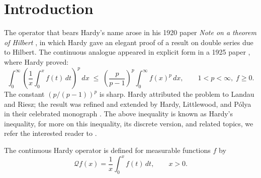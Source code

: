 \documentclass[12pt,a4paper]{amsart}
\theoremstyle{definition}
\newcommand{\dt}{\,dt}
\newcommand{\dx}{\,dx}
\begin{document}
\section{Introduction}
The operator that bears Hardy's name arose in his 1920 paper
\emph{Note on a theorem of Hilbert} \cite{Hardy1920}, in which Hardy
gave an elegant proof of a result on double series due to Hilbert.
The continuous analogue appeared in explicit form in a 1925 paper
\cite{Hardy1925}, where Hardy proved:
\[
  \int_0^\infty \!\left(\frac{1}{x}\int_0^x f(t)\dt\right)^p\!\dx
  \;\le\;\left(\frac{p}{p-1}\right)^p\int_0^\infty f(x)^p\dx,
  \qquad 1<p<\infty,\; f\ge 0.
\]
The constant $(p/(p-1))^p$ is sharp. Hardy attributed the problem to Landau and Riesz;
the result was refined and extended by Hardy,
Littlewood, and P\'olya in their celebrated monograph \cite{HLP1934}. The above inequality is known as Hardy's inequality, for more on this inequality, its discrete version, and related topics, we refer the interested reader to \cite{Kufner2006,Kufner2007,Muckenhoupt1972,Opic1990}.

The continuous Hardy operator is defined for measurable functions $f$
by
\begin{equation}\label{eq:Qdef}
  \mathcal{Q}f(x) = \frac{1}{x}\int_0^{x} f(t)\dt, \qquad x>0.
\end{equation}
\end{document}
